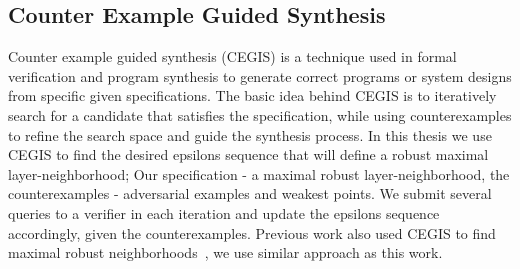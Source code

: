 \documentclass[11pt]{article}
\begin{document}
\subsection{Counter Example Guided Synthesis}
Counter example guided synthesis (CEGIS) is a technique used in formal verification and program synthesis to generate correct programs or system designs from specific given specifications.
The basic idea behind CEGIS is to iteratively search for a candidate that satisfies the specification, while using counterexamples to refine the search space and guide the synthesis process.
In this thesis we use CEGIS to find the desired epsilons sequence that will define a robust maximal layer-neighborhood;
Our specification - a maximal robust layer-neighborhood, the counterexamples - adversarial examples and weakest points.
We submit several queries to a verifier in each iteration and update the epsilons sequence accordingly, given the counterexamples.
Previous work also used CEGIS to find maximal robust neighborhoods~\cite{MARVEL}, we use similar approach as this work.






\end{document}

